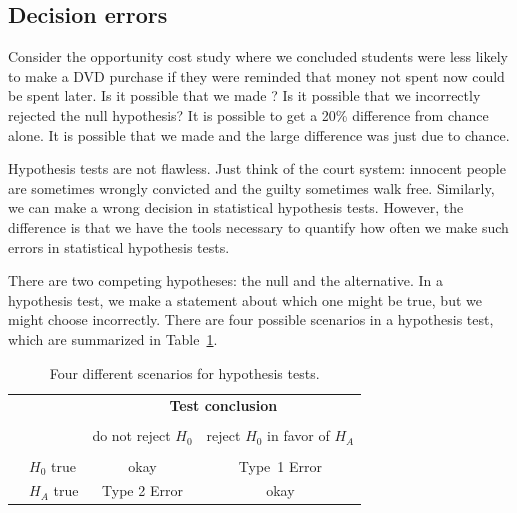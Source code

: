 



\subsection{Decision errors}


\begin{example}{Consider the opportunity cost study where we concluded students were less likely to make a DVD purchase if they were reminded that money not spent now could be spent later. Is it possible that we made ? Is it possible that we incorrectly rejected the null hypothesis?}
It is possible to get a 20\% difference from chance alone. It is possible that we made  and the large difference was just due to chance.
\end{example}

Hypothesis tests are not flawless. Just think of the court system: innocent people are sometimes wrongly convicted and the guilty sometimes walk free. Similarly, we can make a wrong decision in statistical hypothesis tests. However, the difference is that we have the tools necessary to quantify how often we make such errors in statistical hypothesis tests.

There are two competing hypotheses: the null and the alternative. In a hypothesis test, we make a statement about which one might be true, but we might choose incorrectly. There are four possible scenarios in a hypothesis test, which are summarized in Table~\ref{fourHTScenarios}.

\begin{table}[ht]
\centering
\begin{tabular}{l l c c}
& & \multicolumn{2}{c}{\textbf{Test conclusion}} \\
  \cline{3-4}
\vspace{-3.7mm} \\
& & do not reject $H_0$ &  reject $H_0$ in favor of $H_A$ \\
  \cline{2-4}
\vspace{-3.7mm} \\
& $H_0$ true & okay &  Type~1 Error \\
\raisebox{1.5ex}{\textbf{Truth}} & $H_A$ true & Type 2 Error & okay \\
  \cline{2-4}
\end{tabular}
\caption{Four different scenarios for hypothesis tests.}
\label{fourHTScenarios}
\end{table}

